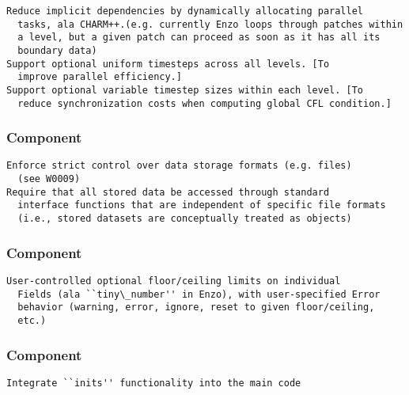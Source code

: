 \documentclass[14pt,letter]{article}
\begin{document}
\begin{verbatim}
Reduce implicit dependencies by dynamically allocating parallel
  tasks, ala CHARM++.(e.g. currently Enzo loops through patches within
  a level, but a given patch can proceed as soon as it has all its
  boundary data)
Support optional uniform timesteps across all levels. [To
  improve parallel efficiency.]
Support optional variable timestep sizes within each level. [To
  reduce synchronization costs when computing global CFL condition.]
\end{verbatim}

\subsubsection{ Component}

\begin{verbatim}
Enforce strict control over data storage formats (e.g. files)
  (see W0009)
Require that all stored data be accessed through standard
  interface functions that are independent of specific file formats
  (i.e., stored datasets are conceptually treated as objects)
\end{verbatim}

\subsubsection{ Component}

\begin{verbatim}
User-controlled optional floor/ceiling limits on individual
  Fields (ala ``tiny\_number'' in Enzo), with user-specified Error
  behavior (warning, error, ignore, reset to given floor/ceiling,
  etc.)
\end{verbatim}

\subsubsection{ Component}

\begin{verbatim}
Integrate ``inits'' functionality into the main code
\end{verbatim}
\end{document}
